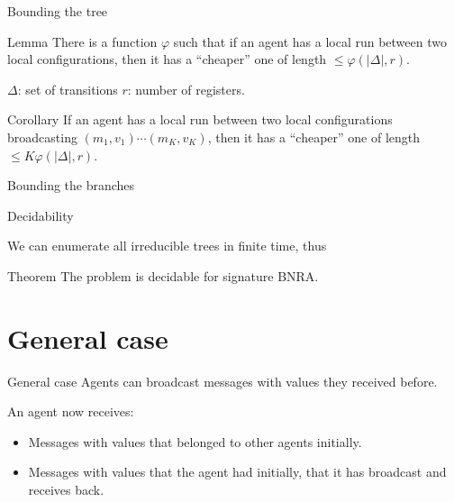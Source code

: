 \documentclass{beamer}
\begin{document}
\begin{frame}{Bounding the tree}
	
	\begin{block}{Lemma}
		There is a function $\varphi$ such that if an agent has a local run between two local configurations, then it has a ``cheaper'' one of length $\leq \varphi(|\Delta|,r)$. 
	\end{block}
	
	$\Delta$: set of transitions \hspace{1cm} $r$: number of registers.
	
	\begin{block}{Corollary}
		If an agent has a local run between two local configurations broadcasting  $(m_1,v_1) \cdots (m_K, v_K)$, then it has a ``cheaper'' one of length $\leq K\varphi(|\Delta|,r)$. 
	\end{block}
\end{frame}

\begin{frame}{Bounding the branches}
	
	

\end{frame}


\begin{frame}{Decidability}
	
	
	We can enumerate all irreducible trees in finite time, thus
	
	\begin{block}{Theorem}
		The {} problem is decidable for \color{blue}signature \color{black} BNRA.
	\end{block}
\end{frame}


\section{General case}

\begin{frame}
	\tableofcontents[currentsection]
\end{frame}

\begin{frame}{General case}
	Agents can broadcast messages with values they received before.
	\vspace{0.5cm}
	
	An agent now receives:
	\begin{itemize}
		\item Messages with values that belonged to other agents initially.
		
		\item Messages with values that the agent had initially, that it has broadcast and receives back.
	\end{itemize}
\end{frame}
\end{document}
